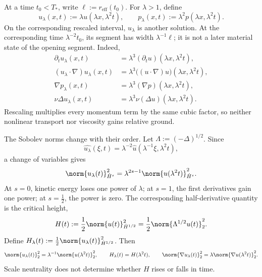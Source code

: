 
At a time \(t_0<T_*\), write \(\ell:=r_{\mathrm{eff}}(t_0)\). For \(\lambda>1\), define
\[
  u_\lambda(x,t)
  :=
  \lambda u(\lambda x,\lambda^2t),
  \qquad
  p_\lambda(x,t)
  :=
  \lambda^2p(\lambda x,\lambda^2t).
\]
On the corresponding rescaled interval, \(u_\lambda\) is another \NavierStokes{} solution. At the corresponding time \(\lambda^{-2}t_0\), its segment has width \(\lambda^{-1}\ell\); it is not a later material state of the opening segment. Indeed,
\[
\begin{aligned}
  \partial_tu_\lambda(x,t)
  &=
  \lambda^3(\partial_tu)(\lambda x,\lambda^2t),
  \\
  (u_\lambda\cdot\nabla)u_\lambda(x,t)
  &=
  \lambda^3\bigl((u\cdot\nabla)u\bigr)(\lambda x,\lambda^2t),
  \\
  \nabla p_\lambda(x,t)
  &=
  \lambda^3(\nabla p)(\lambda x,\lambda^2t),
  \\
  \nu\Delta u_\lambda(x,t)
  &=
  \lambda^3\nu(\Delta u)(\lambda x,\lambda^2t).
\end{aligned}
\]
Rescaling multiplies every momentum term by the same cubic factor, so neither nonlinear transport nor viscosity gains relative ground.


The Sobolev norms change with their order. Let \(\Lambda:=(-\Delta)^{1/2}\). Since
\[
  \widehat{u_\lambda}(\xi,t)
  =
  \lambda^{-2}\widehat u(\lambda^{-1}\xi,\lambda^2t),
\]
a change of variables gives
\[
  \norm{u_\lambda(t)}_{\dot H^s}^2
  =
  \lambda^{2s-1}
  \norm{u(\lambda^2t)}_{\dot H^s}^2.
\]
At \(s=0\), kinetic energy loses one power of \(\lambda\); at \(s=1\), the first derivatives gain one power; at \(s=\tfrac12\), the power is zero. The corresponding half-derivative quantity is the critical height,
\[
  H(t)
  :=
  \frac12\norm{u(t)}_{\dot H^{1/2}}^2
  =
  \frac12\norm{\Lambda^{1/2}u(t)}_2^2.
\]
Define \(H_\lambda(t):=\frac12\norm{u_\lambda(t)}_{\dot H^{1/2}}^2\). Then
\[
  \norm{u_\lambda(t)}_2^2
  =
  \lambda^{-1}\norm{u(\lambda^2t)}_2^2,
  \qquad
  H_\lambda(t)=H(\lambda^2t),
  \qquad
  \norm{\nabla u_\lambda(t)}_2^2
  =
  \lambda\norm{\nabla u(\lambda^2t)}_2^2.
\]
Scale neutrality does not determine whether \(H\) rises or falls in time.



